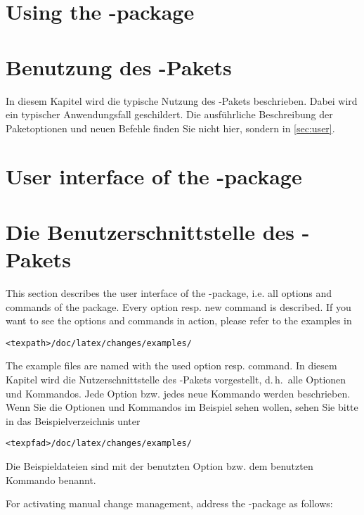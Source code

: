 \ifENGLISH
	\section{Using the -package}
\fi
	\ifGERMAN
		\section{Benutzung des -Pakets}
	\fi
\label{sec:user}

\ifENGLISH
\fi
	\ifGERMAN
		In diesem Kapitel wird die typische Nutzung des -Pakets beschrieben.
		Dabei wird ein typischer Anwendungsfall geschildert.
		Die ausführliche Beschreibung der Paketoptionen und neuen Befehle finden Sie nicht hier, sondern in \autoref{sec:user}.


	\fi

\ifENGLISH
	\section{User interface of the -package}
\fi
	\ifGERMAN
		\section{Die Benutzerschnittstelle des -Pakets}
	\fi
\label{sec:user}

\ifENGLISH
	This section describes the user interface of the -package, i.e. all options and commands of the package.
	Every option resp. new command is described.
	If you want to see the options and commands in action, please refer to the examples in

	\texttt{<texpath>/doc/latex/changes/examples/}

	The example files are named with the used option resp. command.
\fi
	\ifGERMAN
		In diesem Kapitel wird die Nutzerschnittstelle des -Pakets vorgestellt, d.\,h.\ alle Optionen und Kommandos.
		Jede Option bzw. jedes neue Kommando werden beschrieben.
		Wenn Sie die Optionen und Kommandos im Beispiel sehen wollen, sehen Sie bitte in das Beispielverzeichnis unter

		\texttt{<texpfad>/doc/latex/changes/examples/}

		Die Beispieldateien sind mit der benutzten Option bzw. dem benutzten Kommando benannt.
	\fi

\ifENGLISH
	For activating manual change management, address the -package as follows:

